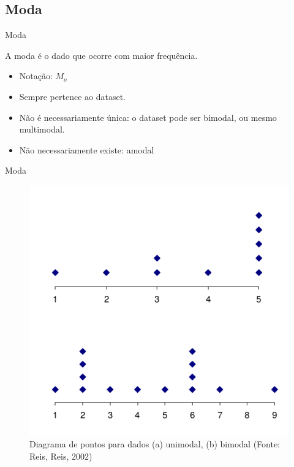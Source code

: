 \documentclass{beamer}
\begin{document}
\subsection{Moda}
\begin{frame}{Moda}
  \begin{definition}
    A moda é o dado que ocorre com \alert{maior frequência}.
  \end{definition}
  \begin{itemize}
  \item Notação: $M_o$
  \item Sempre pertence ao dataset.
  \item Não é necessariamente única: o dataset pode ser
    \alert{bimodal}, ou mesmo \alert{multimodal}.
  \item Não necessariamente existe: \alert{amodal}
  \end{itemize}
\end{frame}

\begin{frame}{Moda}
  \begin{figure}
    \centering
    \includegraphics[height=0.7\textheight]{Desc_II/moda}
    \caption{Diagrama de pontos para dados (a) unimodal, (b) bimodal
      (Fonte: Reis, Reis, 2002)}
  \end{figure}
\end{frame}
\end{document}
